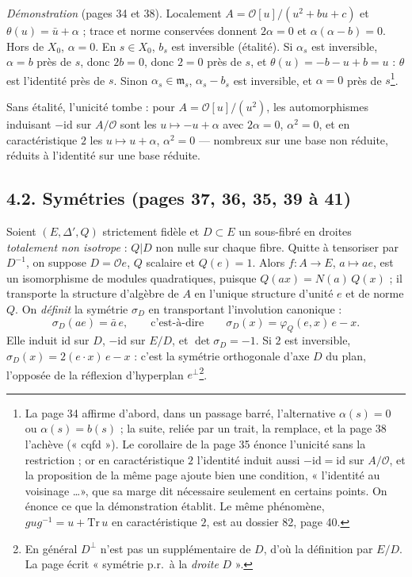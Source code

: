 \documentclass[11pt,a4paper]{article}
\begin{document}
\emph{Démonstration} (pages 34 et 38). Localement $A = \mathcal{O}[u]/(u^{2} + bu + c)$
et $\theta(u) = \bar{u} + \alpha$ ; trace et norme conservées donnent $2\alpha = 0$ et
$\alpha(\alpha - b) = 0$. Hors de $X_0$, $\alpha = 0$. En $s \in X_0$, $b_s$ est
inversible (étalité). Si $\alpha_s$ est inversible, $\alpha = b$ près de $s$, donc
$2b = 0$, donc $2 = 0$ près de $s$, et $\theta(u) = -b - u + b = u$ : $\theta$ est
l'identité près de $s$. Sinon $\alpha_s \in \mathfrak{m}_s$, $\alpha_s - b_s$ est
inversible, et $\alpha = 0$ près de $s$\footnote{La page 34 affirme d'abord, dans un
passage barré, l'alternative $\alpha(s) = 0$ ou $\alpha(s) = b(s)$ ; la suite,
reliée par un trait, la remplace, et la page 38 l'achève (« cqfd »). Le corollaire
de la page 35 énonce l'unicité sans la restriction ; or en caractéristique $2$
l'identité induit aussi $-\mathrm{id} = \mathrm{id}$ sur $A/\mathcal{O}$, et la
proposition de la même page ajoute bien une condition, « l'identité au voisinage
\ldots », que sa marge dit nécessaire seulement en certains points. On énonce ce
que la démonstration établit. Le même phénomène, $gug^{-1} = u + \mathrm{Tr}\,u$ en
caractéristique $2$, est au dossier 82, page 40.}.

Sans étalité, l'unicité tombe : pour $A = \mathcal{O}[u]/(u^{2})$, les
automorphismes induisant $-\mathrm{id}$ sur $A/\mathcal{O}$ sont les $u \mapsto -u +
\alpha$ avec $2\alpha = 0$, $\alpha^{2} = 0$, et en caractéristique $2$ les
$u \mapsto u + \alpha$, $\alpha^{2} = 0$ --- nombreux sur une base non réduite,
réduits à l'identité sur une base réduite.

\subsection*{4.2. Symétries (pages 37, 36, 35, 39 à 41)}

Soient $(E, \Delta', Q)$ strictement fidèle et $D \subset E$ un sous-fibré en droites
\emph{totalement non isotrope} : $Q|D$ non nulle sur chaque fibre. Quitte à
tensoriser par $D^{-1}$, on suppose $D = \mathcal{O}e$, $Q$ scalaire et $Q(e) = 1$.
Alors $f : A \to E$, $a \mapsto ae$, est un isomorphisme de modules quadratiques,
puisque $Q(ax) = N(a)\,Q(x)$ ; il transporte la structure d'algèbre de $A$ en
l'unique structure d'unité $e$ et de norme $Q$. On \emph{définit} la symétrie
$\sigma_D$ en transportant l'involution canonique :
\[
  \sigma_D(ae) = \bar{a}\,e, \qquad \text{c'est-à-dire} \qquad \sigma_D(x) = \varphi_Q(e, x)\,e - x .
\]
Elle induit $\mathrm{id}$ sur $D$, $-\mathrm{id}$ sur $E/D$, et $\det\sigma_D = -1$. Si
$2$ est inversible, $\sigma_D(x) = 2(e\cdot x)\,e - x$ : c'est la symétrie
orthogonale d'axe $D$ du plan, l'opposée de la réflexion d'hyperplan
$e^{\perp}$\footnote{En général $D^{\perp}$ n'est pas un supplémentaire de $D$, d'où
la définition par $E/D$. La page écrit « symétrie p.r.\ à la \emph{droite} $D$ ».}.
\end{document}
